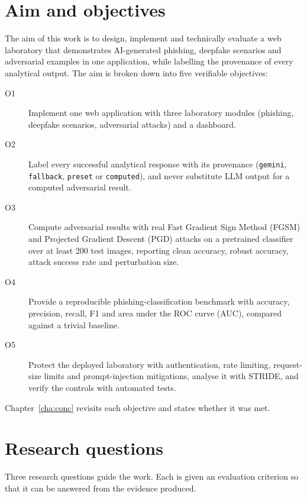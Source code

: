 \section{Aim and objectives}
\label{sec:objectives}

The aim of this work is to design, implement and technically evaluate a web laboratory that demonstrates AI-generated phishing, deepfake scenarios and adversarial examples in one application, while labelling the provenance of every analytical output. The aim is broken down into five verifiable objectives:

\begin{description}
\item[O1] Implement one web application with three laboratory modules (phishing, deepfake scenarios, adversarial attacks) and a dashboard.
\item[O2] Label every successful analytical response with its provenance (\texttt{gemini}, \texttt{fallback}, \texttt{preset} or \texttt{computed}), and never substitute LLM output for a computed adversarial result.
\item[O3] Compute adversarial results with real Fast Gradient Sign Method (FGSM) and Projected Gradient Descent (PGD) attacks on a pretrained classifier over at least 200 test images, reporting clean accuracy, robust accuracy, attack success rate and perturbation size.
\item[O4] Provide a reproducible phishing-classification benchmark with accuracy, precision, recall, F1 and area under the ROC curve (AUC), compared against a trivial baseline.
\item[O5] Protect the deployed laboratory with authentication, rate limiting, request-size limits and prompt-injection mitigations, analyse it with STRIDE, and verify the controls with automated tests.
\end{description}

Chapter~\ref{cha:conc} revisits each objective and states whether it was met.

\section{Research questions}
\label{sec:rqs}

Three research questions guide the work. Each is given an evaluation criterion so that it can be answered from the evidence produced.

